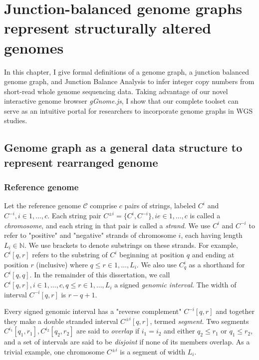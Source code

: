 \documentclass[phd,tocprelim]{cornell}
\begin{document}
\chapter{Junction-balanced genome graphs represent structurally altered genomes}
In this chapter, I give formal definitions of a genome graph, a junction balanced genome graph, and Junction Balance Analysis to infer integer copy numbers from short-read whole genome sequencing data. Taking advantage of our novel interactive genome browser \textit{gGnome.js}, I show that our complete toolset can serve as an intuitive portal for researchers to incorporate genome graphs in WGS studies.

\newpage

\section{Genome graph as a general data structure to represent rearranged genome}
\subsection{Reference genome}
Let the reference genome $\mathcal{C}$ comprise $c$ pairs of strings, labeled $C^i$ and $C^{-i}, i \in 1,\dots,c$. Each string pair $C^{\pm{i}} = \{C^i, C^{-i}\}, i e\in 1,\dots, c$ is called a \textit{chromosome}, and each string in that pair is called a \textit{strand}. We use $C^i$ and $C^{-i}$ to refer to "positive" and "negative" strands of chromosome $i$, each having length $L_i \in \mathbb{N}$. We use brackets to denote substrings on these strands. For example, $C^{i}[q,r]$ refers to the substring of $C^{i}$ beginning at position $q$ and ending at position $r$ (inclusive) where $q \le r \in 1,\dots,L_i$. We also use $C^{i}_q$ as a shorthand for $C^{i}[q,q]$. In the remainder of this dissertation, we call $C^{i}[q,r], i \in 1, \dots, c, q \le r \in 1, \dots, L_i$ a signed \textit{genomic interval}. The width of interval $C^{-i}[q,r]$ is $r-q+1$.

Every signed genomic interval has a "reverse complement" $C^{-i}[q,r]$ and together they make a double stranded interval $C^{\pm{i}}[q,r]$, termed \textit{segment}. Two segments $C^{i_1}[q_1, r_1], C^{i_2}[q_2, r_2]$ are said to \textit{overlap} if $i_1 = i_2$ and either $q_2 \le r_1$ or $q_1 \le r_2$, and a set of intervals are said to be \textit{disjoint} if none of its members overlap. As a trivial example, one chromosome $C^{\pm{i}}$ is a segment of width $L_i$.
\end{document}
